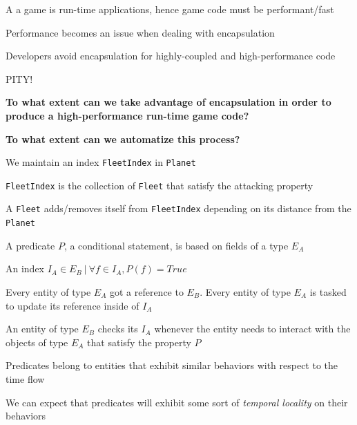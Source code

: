\documentclass{beamer}
\begin{document}
\begin{slide}{
\item A a game is run-time applications, hence game code must be performant/fast
\item Performance becomes an issue when dealing with encapsulation
\item Developers avoid encapsulation for highly-coupled and high-performance code
\item[]
\item PITY!
}\end{slide}

\begin{slide}{
\item \textbf{To what extent can we take advantage of encapsulation in order to produce a high-performance run-time game code?}
\item \textbf{To what extent can we automatize this process?}
}\end{slide}


\begin{slide}{
\item We maintain an index \texttt{FleetIndex} in \texttt{Planet}
\item \texttt{FleetIndex} is the collection of \texttt{Fleet} that satisfy the attacking property
\item A \texttt{Fleet} adds/removes itself from \texttt{FleetIndex} depending on its distance from the \texttt{Planet}
}\end{slide}


\begin{slide}{
\item A predicate $P$, a conditional statement, is based on fields of a type $E_{A}$
\item An index ${I_{A} \in E_{B} \ |\ \forall f \in I_{A}, P(f) = True}$
\item Every entity of type $E_{A}$ got a reference to $E_{B}$. Every entity of type $E_{A}$ is tasked to update its reference inside of $I_{A}$
\item An entity of type $E_{B}$ checks its $I_{A}$ whenever the entity needs to interact with the objects of type $E_{A}$ that satisfy the property $P$
}\end{slide}

\begin{slide}{
\item Predicates belong to entities that exhibit similar behaviors with respect to the time flow
\item We can expect that predicates will exhibit some sort of \textit{temporal locality} on their behaviors
}\end{slide}
\end{document}
